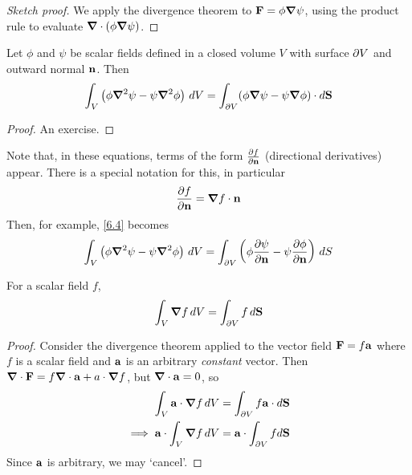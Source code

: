 \documentclass{../template/note}
\begin{document}
    \begin{proof}[Sketch proof]
        We apply the divergence theorem to \(\V F = \phi \grad \psi\), using the product rule to evaluate \(\div(\phi \grad \psi)\).
    \end{proof}
    
    \begin{proposition}
        \label{6.4}
        Let \(\phi\) and \(\psi\) be scalar fields defined in a closed volume \(V\) with surface \(\partial V\) and outward normal \(\V n\). Then
        \begin{align*}
            \int_V \left(\phi \grad^2 \psi - \psi \grad^2 \phi\right) \D V = \int_{\pr V} (\phi \grad \psi - \psi \grad \phi) \cdot d\V S
        \end{align*}
    \end{proposition}
    
    \begin{proof}
        An exercise.
    \end{proof}
    
    Note that, in these equations, terms of the form \(\pd{f}{\V n}\) (directional derivatives) appear. There is a special notation for this, in particular
    \begin{align*}
        \pd{f}{\V n} = \grad f \cdot \V n
    \end{align*}
    Then, for example, \cref{6.4} becomes
    \begin{align*}
        \int_V \left(\phi \grad^2 \psi - \psi \grad^2 \phi\right) \D V = \int_{\pr V} \left(\phi \pd{\psi}{\V n} - \psi \pd{\phi}{\V n}\right) \D S
    \end{align*}

    \begin{proposition}
        \label{6.5}
        For a scalar field \(f\),
        \begin{align*}
            \int_V \grad f \D V = \int_{\pr V} f \, d\V S
        \end{align*}
    \end{proposition}

    \begin{proof}
        Consider the divergence theorem applied to the vector field \(\V F = f\V a\) where \(f\) is a scalar field and \(\V a\) is an arbitrary \emph{constant} vector. Then \(\div \V F = f \div \V a + a \cdot \grad f\), but \(\div \V a = 0\), so
        \begin{align*}
            \int_V \V a \cdot \grad f \D V &= \int_{\pr V} f \V a \cdot d\V S \\
            \implies \V a \cdot \int_V \grad f \D V &= \V a \cdot \int_{\pr V} f d\V S
        \end{align*}
        Since \(\V a\) is arbitrary, we may `cancel'.
    \end{proof}
    
\end{document}
